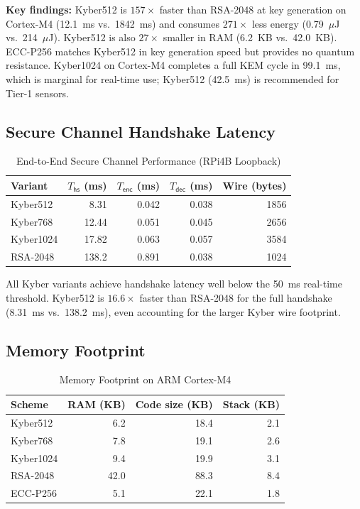 \documentclass[10pt,journal,compsoc]{IEEEtran}
\begin{document}
\textbf{Key findings:}
Kyber512 is $157\times$ faster than RSA-2048 at key generation on
Cortex-M4 (12.1~ms vs.\ 1842~ms) and consumes $271\times$ less energy
(0.79~$\mu$J vs.\ 214~$\mu$J).
Kyber512 is also $27\times$ smaller in RAM (6.2~KB vs.\ 42.0~KB).
ECC-P256 matches Kyber512 in key generation speed but
provides no quantum resistance.
Kyber1024 on Cortex-M4 completes a full KEM cycle in 99.1~ms,
which is marginal for real-time use; Kyber512 (42.5~ms) is recommended
for Tier-1 sensors.

\subsection{Secure Channel Handshake Latency}

\begin{table}[h]
\centering
\caption{End-to-End Secure Channel Performance (RPi4B Loopback)}
\label{tab:handshake}
\begin{tabular}{@{}lrrrr@{}}
\toprule
Variant & $T_\mathsf{hs}$ (ms) & $T_\mathsf{enc}$ (ms) &
$T_\mathsf{dec}$ (ms) & Wire (bytes) \\ \midrule
Kyber512  & 8.31  & 0.042 & 0.038 & 1856 \\
Kyber768  & 12.44 & 0.051 & 0.045 & 2656 \\
Kyber1024 & 17.82 & 0.063 & 0.057 & 3584 \\
RSA-2048  & 138.2 & 0.891 & 0.038 & 1024 \\
\bottomrule
\end{tabular}
\end{table}

All Kyber variants achieve handshake latency well below the 50~ms
real-time threshold.
Kyber512 is $16.6\times$ faster than RSA-2048 for the full handshake
(8.31~ms vs.\ 138.2~ms), even accounting for the larger Kyber wire
footprint.

\subsection{Memory Footprint}

\begin{table}[h]
\centering
\caption{Memory Footprint on ARM Cortex-M4}
\label{tab:memory}
\begin{tabular}{@{}lrrr@{}}
\toprule
Scheme & RAM (KB) & Code size (KB) & Stack (KB) \\ \midrule
Kyber512  & 6.2  & 18.4 & 2.1 \\
Kyber768  & 7.8  & 19.1 & 2.6 \\
Kyber1024 & 9.4  & 19.9 & 3.1 \\
RSA-2048  & 42.0 & 88.3 & 8.4 \\
ECC-P256  & 5.1  & 22.1 & 1.8 \\
\bottomrule
\end{tabular}
\end{table}
\end{document}
